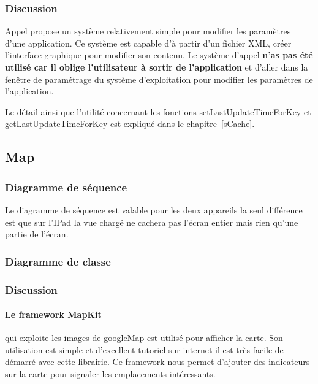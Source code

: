 		\subsubsection*{Discussion}

		Appel propose un système relativement simple pour modifier les paramètres d'une application. Ce système est capable d'à partir d'un fichier XML, créer l'interface graphique pour modifier son contenu. Le système d'appel \textbf{n'as pas été utilisé car il oblige l'utilisateur à sortir de l'application }et d'aller dans la fenêtre de paramétrage du système d'exploitation pour modifier les paramètres de l'application.  
		
		Le détail ainsi que l'utilité concernant les fonctions setLastUpdateTimeForKey et getLastUpdateTimeForKey est expliqué dans le chapitre~\ref{sCache}.

		
	\subsection{Map}
		\subsubsection*{Diagramme de séquence}
			Le diagramme de séquence est valable pour les deux appareils la seul différence est que sur l'IPad la vue chargé  ne cachera pas l'écran entier mais rien qu'une partie de l'écran.
		\subsubsection*{Diagramme de classe}
		\subsubsection*{Discussion}
		\paragraph{Le framework MapKit }
		qui exploite les images de googleMap est utilisé pour afficher la carte. Son utilisation est simple et d'excellent tutoriel \cite{tutoNet} sur internet il est très facile de démarré avec cette librairie. Ce framework nous permet d'ajouter des indicateurs sur la carte pour signaler les emplacements intéressants. 


